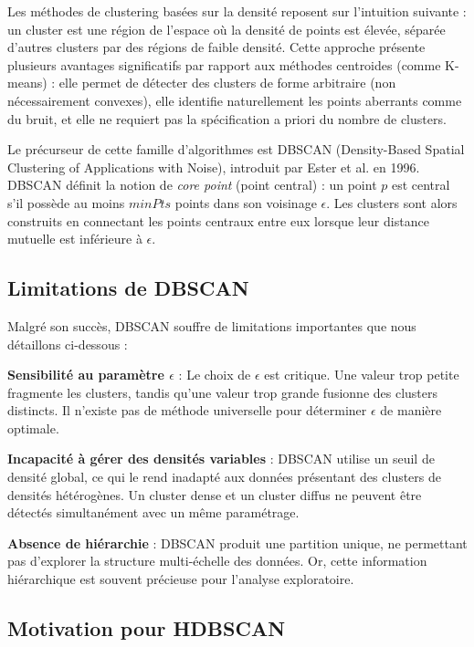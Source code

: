 \documentclass[11pt,a4paper]{article}
\begin{document}
Les méthodes de clustering basées sur la densité reposent sur l'intuition suivante : un cluster est une région de l'espace où la densité de points est élevée, séparée d'autres clusters par des régions de faible densité. Cette approche présente plusieurs avantages significatifs par rapport aux méthodes centroides (comme K-means) : elle permet de détecter des clusters de forme arbitraire (non nécessairement convexes), elle identifie naturellement les points aberrants comme du bruit, et elle ne requiert pas la spécification a priori du nombre de clusters.

Le précurseur de cette famille d'algorithmes est DBSCAN (Density-Based Spatial Clustering of Applications with Noise), introduit par Ester et al. en 1996. DBSCAN définit la notion de \textit{core point} (point central) : un point $p$ est central s'il possède au moins $\mathit{minPts}$ points dans son voisinage $\epsilon$. Les clusters sont alors construits en connectant les points centraux entre eux lorsque leur distance mutuelle est inférieure à $\epsilon$.

\subsection{Limitations de DBSCAN}

Malgré son succès, DBSCAN souffre de limitations importantes que nous détaillons ci-dessous :

\textbf{Sensibilité au paramètre $\epsilon$} : Le choix de $\epsilon$ est critique. Une valeur trop petite fragmente les clusters, tandis qu'une valeur trop grande fusionne des clusters distincts. Il n'existe pas de méthode universelle pour déterminer $\epsilon$ de manière optimale.

\textbf{Incapacité à gérer des densités variables} : DBSCAN utilise un seuil de densité global, ce qui le rend inadapté aux données présentant des clusters de densités hétérogènes. Un cluster dense et un cluster diffus ne peuvent être détectés simultanément avec un même paramétrage.

\textbf{Absence de hiérarchie} : DBSCAN produit une partition unique, ne permettant pas d'explorer la structure multi-échelle des données. Or, cette information hiérarchique est souvent précieuse pour l'analyse exploratoire.

\subsection{Motivation pour HDBSCAN}
\end{document}
